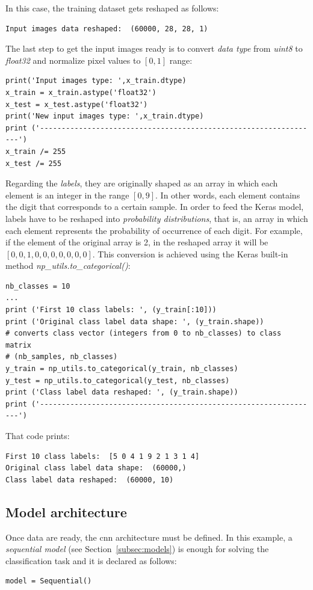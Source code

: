 In this case, the training dataset gets reshaped as follows:
\begin{Verbatim}[frame=single]
Input images data reshaped:  (60000, 28, 28, 1)
\end{Verbatim}

The last step to get the input images ready is to convert \emph{data type} from \textit{uint8} to \textit{float32} and normalize pixel values to $[0,1]$ range:
\begin{lstlisting}
print('Input images type: ',x_train.dtype)
x_train = x_train.astype('float32')
x_test = x_test.astype('float32')
print('New input images type: ',x_train.dtype)
print ('-----------------------------------------------------------------')
x_train /= 255
x_test /= 255
\end{lstlisting}

Regarding the \emph{labels}, they are originally shaped as an array in which each element is an integer in the range $[0, 9]$. In other words, each element contains the digit that corresponds to a certain sample. In order to feed the Keras model, labels have to be reshaped into \emph{probability distributions}, that is, an array in which each element represents the probability of occurrence of each digit. For example, if the element of the original array is 2, in the reshaped array it will be $[0, 0, 1, 0, 0, 0, 0, 0, 0, 0]$. This conversion is achieved using the Keras built-in method \emph{\textit{np\_utils.to\_categorical()}}:
\begin{lstlisting}
nb_classes = 10
...
print ('First 10 class labels: ', (y_train[:10]))
print ('Original class label data shape: ', (y_train.shape))
# converts class vector (integers from 0 to nb_classes) to class matrix
# (nb_samples, nb_classes)
y_train = np_utils.to_categorical(y_train, nb_classes)
y_test = np_utils.to_categorical(y_test, nb_classes)
print ('Class label data reshaped: ', (y_train.shape))
print ('-----------------------------------------------------------------')
\end{lstlisting}

That code prints:
\begin{Verbatim}[frame=single]
First 10 class labels:  [5 0 4 1 9 2 1 3 1 4]
Original class label data shape:  (60000,)
Class label data reshaped:  (60000, 10)
\end{Verbatim}

\subsection{Model architecture}
Once data are ready, the \gls{cnn} architecture must be defined. In this example, a \emph{sequential model} (see Section~\ref{subsec:models}) is enough for solving the classification task and it is declared as follows:
\begin{lstlisting}
model = Sequential()
\end{lstlisting}

